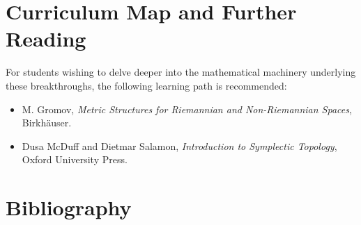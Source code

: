 \section{Curriculum Map and Further Reading}
For students wishing to delve deeper into the mathematical machinery underlying these breakthroughs, the following learning path is recommended:
\begin{itemize}
  \item M. Gromov, \emph{Metric Structures for Riemannian and Non-Riemannian Spaces}, Birkh\"auser.
  \item Dusa McDuff and Dietmar Salamon, \emph{Introduction to Symplectic Topology}, Oxford University Press.
\end{itemize}

\section*{Bibliography}

